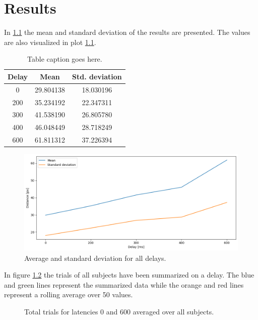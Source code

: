 \documentclass[nofilelist]{cslthse-msc}
\begin{document}
\chapter{Results}
In \ref{tab:averages} the mean and standard deviation of the results are presented. The values are also visualized in plot \ref{fig:avg-std}.
\begin{table}[ht]
   \centering
   \begin{tabular}{|c|c|c|}
   \hline
   \textbf{Delay} & \textbf{ Mean} & \textbf{Std. deviation} \\
   \hline
   0 & 29.804138 & 18.030196 \\ \hline
   200 & 35.234192 & 22.347311 \\ \hline
   300 & 41.538190 & 26.805780 \\ \hline
   400 & 46.048449 & 28.718249 \\ \hline
   600 & 61.811312 & 37.226394 \\ \hline
   \end{tabular}
   \caption{Table caption goes here.}
   \label{tab:averages}
\end{table}

\begin{figure}[!hbt]
   \centering
   \includegraphics[scale=0.5]{images/avg-std.png} 
   \caption{Average and standard deviation for all delays.}
   \label{fig:avg-std}
\end{figure}

In figure \ref{fig:0vs600} the trials of all subjects have been summarized on a delay. The blue and green lines represent the summarized data while the orange and red lines represent a rolling average over 50 values. 

\begin{figure}[!hbt]
   \centering
   \caption{Total trials for latencies 0 and 600 averaged over all subjects.}
   \label{fig:0vs600}
\end{figure}
\end{document}
